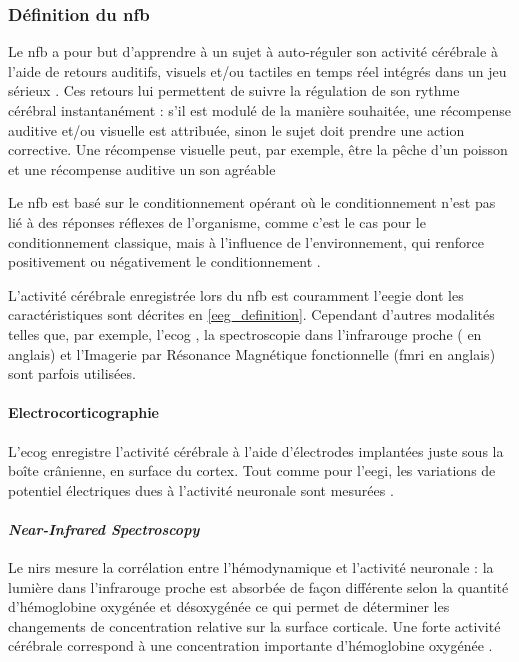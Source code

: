 \subsubsection{Définition du \gls{nfb}}

Le \gls{nfb} a pour but d'apprendre à un sujet à auto-réguler son activité cérébrale à l'aide de retours auditifs, visuels et/ou tactiles en temps réel
intégrés dans un jeu sérieux \citep{Wang2010, Marzbani2016}. Ces retours lui permettent de suivre la régulation de son rythme cérébral instantanément : s'il est modulé de 
la manière souhaitée, une récompense auditive et/ou visuelle est attribuée, sinon le sujet doit prendre une action corrective. Une récompense visuelle
peut, par exemple, être la pêche d'un poisson \citep{Bioulac2019} et une récompense auditive un son agréable \citep{Strehl2006}

Le \gls{nfb} est basé sur le conditionnement opérant \citep{Reynolds1975} où le conditionnement n'est pas lié à 
des réponses réflexes de l'organisme, comme c'est le cas pour le conditionnement classique, mais à l'influence de l'environnement, qui 
renforce positivement ou négativement le conditionnement \citep{Skinner1948}. 

L'activité cérébrale enregistrée lors du \gls{nfb} est couramment l'\gls{eegie} dont les caractéristiques sont décrites en \ref{eeg_definition}.
Cependant d'autres modalités telles que, par exemple, 
l'\gls{ecog} \citep{Khanna2016, Gharabaghi2014}, la spectroscopie dans l'infrarouge proche ( en anglais) \citep{Marx2015} et 
l'Imagerie par Résonance Magnétique fonctionnelle (\gls{fmri} en anglais) \citep{Sulzer2013}
sont parfois utilisées. 

\paragraph{Electrocorticographie} 
L'\gls{ecog} enregistre l'activité cérébrale à l'aide d'électrodes implantées juste sous la boîte crânienne, en surface du cortex. Tout comme pour l'\gls{eegi}, 
les variations de potentiel électriques dues à l'activité neuronale sont mesurées \citep{Leuthardt2006}. 

\paragraph{\textit{Near-Infrared Spectroscopy}} 
Le \gls{nirs} mesure la corrélation entre l'hémodynamique et l'activité neuronale : la lumière dans l'infrarouge proche est absorbée de
façon différente selon la quantité d'hémoglobine oxygénée et désoxygénée ce qui permet de déterminer les changements de concentration relative
sur la surface corticale. Une forte activité cérébrale correspond à une concentration importante d'hémoglobine oxygénée \citep{Fallgatter1997, Marx2015}. 

